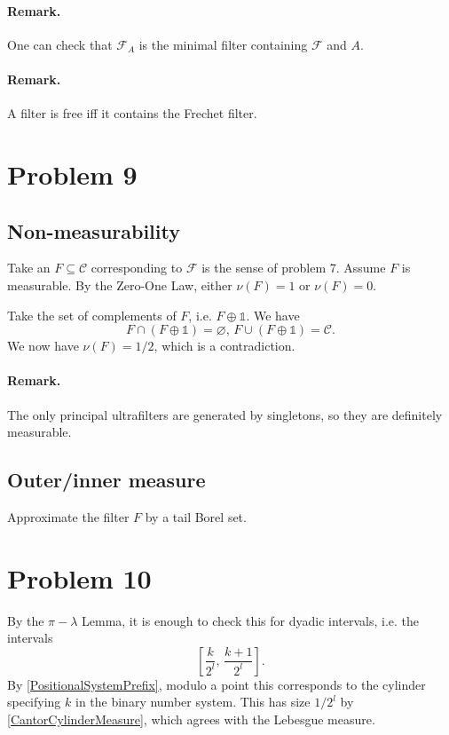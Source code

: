 \paragraph{Remark.} One can check that \( \mathcal{F}_A \) is the minimal filter containing \( \mathcal{F} \) and \( A \).

\paragraph{Remark.} A filter is free iff it contains the Frechet filter.

\section*{Problem 9}

\subsection*{Non-measurability}

Take an \( F \subseteq  \mathcal{C} \) corresponding to \( \mathcal{F} \) is the sense of problem 7. Assume \( F \) is measurable. By the Zero-One Law, either \( \nu( F ) = 1 \) or \( \nu( F ) = 0 \).

Take the set of complements of \( F \), i.e. \( F \oplus \mathbb{1} \). We have
\[ 
    F \cap (F \oplus \mathbb{1}) = \varnothing,\, F \cup (F \oplus \mathbb{1}) = \mathcal{C}.
\]
We now have \( \nu(F) = 1/2 \), which is a contradiction.

\paragraph{Remark.} The only principal ultrafilters are generated by singletons, so they are definitely measurable.

\subsection*{Outer/inner measure}

Approximate the filter \( F \) by a tail Borel set.

\section*{Problem 10}

By the \( \pi-\lambda \) Lemma, it is enough to check this for dyadic intervals, i.e. the intervals
\[ 
    \left[ \frac{k}{2^l},\, \frac{k+1}{2^l} \right].
\]
By \ref{PositionalSystemPrefix}, modulo a point this corresponds to the cylinder specifying \( k \) in the binary number system. This has size \( 1/2^l \) by \ref{CantorCylinderMeasure}, which agrees with the Lebesgue measure.

